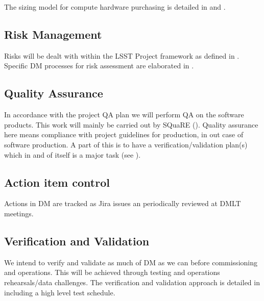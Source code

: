 The sizing model for compute hardware purchasing is detailed in   and .

\subsection {Risk Management } \label{sect:risk}

Risks will be dealt with within the LSST Project framework as defined in .
Specific DM processes for risk assessment are elaborated in .

\subsection {Quality Assurance  } \label{sect:pa}

In accordance with the project QA plan  we will perform QA on the software products.
This work will mainly be carried out by SQuaRE ().
Quality assurance here means compliance with project guidelines for production, in out case of software production. 
A part of this is to have a verification/validation plan(s) which in and of itself is a major task (see ).


\subsection{Action item control}
Actions in DM are tracked as Jira issues an periodically reviewed at DMLT meetings.


\subsection {Verification and Validation } \label{sect:vanv}

We intend to verify and validate as much of DM as we can before commissioning and operations.
This will be achieved through testing and operations rehearsals/data challenges.
The verification and validation approach is detailed in  including a high level test schedule. 
